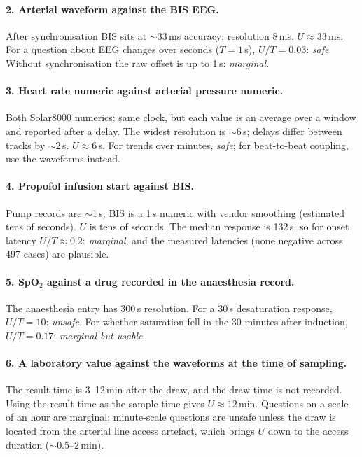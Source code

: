 \documentclass[11pt,a4paper]{article}
\begin{document}
\paragraph{2. Arterial waveform against the BIS EEG.}
After synchronisation BIS sits at $\sim$33\,ms accuracy; resolution 8\,ms. $U\approx 33$\,ms. For a question about
EEG changes over seconds ($T=1$\,s), $U/T=0.03$: \emph{safe}. Without synchronisation the raw offset is up to
1\,s: \emph{marginal}.

\paragraph{3. Heart rate numeric against arterial pressure numeric.}
Both Solar8000 numerics: same clock, but each value is an average over a window and reported after a delay. The
widest resolution is $\sim$6\,s; delays differ between tracks by $\sim$2\,s. $U\approx 6$\,s. For trends over
minutes, \emph{safe}; for beat-to-beat coupling, use the waveforms instead.

\paragraph{4. Propofol infusion start against BIS.}
Pump records are $\sim$1\,s; BIS is a 1\,s numeric with vendor smoothing (estimated tens of seconds). $U$ is tens of
seconds. The median response is 132\,s, so for onset latency $U/T\approx 0.2$: \emph{marginal}, and the
measured latencies (none negative across 497 cases) are plausible.

\paragraph{5. SpO$_2$ against a drug recorded in the anaesthesia record.}
The anaesthesia entry has 300\,s resolution. For a 30\,s desaturation response, $U/T = 10$: \emph{unsafe}. For
whether saturation fell in the 30 minutes after induction, $U/T = 0.17$: \emph{marginal but usable}.

\paragraph{6. A laboratory value against the waveforms at the time of sampling.}
The result time is 3--12\,min after the draw, and the draw time is not recorded. Using the result time as the sample
time gives $U \approx 12$\,min. Questions on a scale of an hour are marginal; minute-scale questions are unsafe
unless the draw is located from the arterial line access artefact, which brings $U$ down to the access duration
($\sim$0.5--2\,min).
\end{document}
